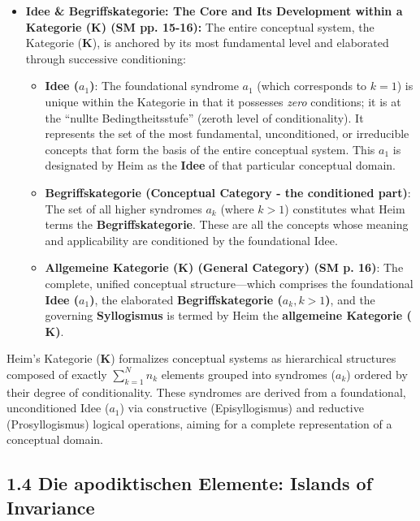 \documentclass[12pt]{article}
\newcommand{\q}[1]{\enquote{#1}}
\newcommand{\kategorie}{\bm{K}}
\newcommand{\conceptualsyndrome}{a}
\begin{document}
\begin{itemize}
    \item \textbf{Idee \& Begriffskategorie: The Core and Its Development within a Kategorie (\(\kategorie\)) (SM pp. 15-16):}
    The entire conceptual system, the Kategorie (\(\kategorie\)), is anchored by its most fundamental level and elaborated through successive conditioning:
    \begin{itemize}
        \item \textbf{Idee (\( \conceptualsyndrome_1 \))}: The foundational syndrome \( \conceptualsyndrome_1 \) (which corresponds to \( k=1 \)) is unique within the Kategorie in that it possesses \textit{zero} conditions; it is at the \q{nullte Bedingtheitsstufe} (zeroth level of conditionality). It represents the set of the most fundamental, unconditioned, or irreducible concepts that form the basis of the entire conceptual system. This \( \conceptualsyndrome_1 \) is designated by Heim as the \textbf{Idee} of that particular conceptual domain.
        \item \textbf{Begriffskategorie (Conceptual Category - the conditioned part)}: The set of all higher syndromes \( \conceptualsyndrome_k \) (where \( k > 1 \)) constitutes what Heim terms the \textbf{Begriffskategorie}. These are all the concepts whose meaning and applicability are conditioned by the foundational Idee.
        \item \textbf{Allgemeine Kategorie (\(\kategorie\)) (General Category) (SM p. 16)}: The complete, unified conceptual structure—which comprises the foundational \textbf{Idee (\( \conceptualsyndrome_1 \))}, the elaborated \textbf{Begriffskategorie (\( \conceptualsyndrome_k, k>1 \))}, and the governing \textbf{Syllogismus} is termed by Heim the \textbf{allgemeine Kategorie (\(\kategorie\))}. 
    \end{itemize}
\end{itemize}

Heim's Kategorie (\(\kategorie\)) formalizes conceptual systems as hierarchical structures composed of exactly $\sum_{k=1}^N n_k$ elements grouped into syndromes (\(\conceptualsyndrome_k\)) ordered by their degree of conditionality. These syndromes are derived from a foundational, unconditioned Idee (\(\conceptualsyndrome_1\)) via constructive (Episyllogismus) and reductive (Prosyllogismus) logical operations, aiming for a complete representation of a conceptual domain.

\subsection{1.4 Die apodiktischen Elemente: Islands of Invariance}
\label{sec:apodiktik}
\end{document}
